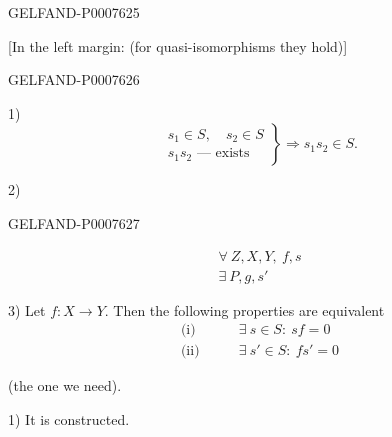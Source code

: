 \begin{GelfandAdjacentEvidence}{GELFAND-P000762}{5}


[In the left margin: (for quasi-isomorphisms they hold)]
\end{GelfandAdjacentEvidence}
\begin{GelfandAdjacentEvidence}{GELFAND-P000762}{6}


1)
\[
\left.
\begin{gathered}
s_1\in S,\quad s_2\in S\\
s_1s_2\text{ --- exists}
\end{gathered}
\right\}\Rightarrow s_1s_2\in S.
\]

2)
\end{GelfandAdjacentEvidence}
\begin{GelfandAdjacentEvidence}{GELFAND-P000762}{7}

\[
\begin{gathered}
\forall\ Z,X,Y,\ f,s\\
\exists\ P,g,s'
\end{gathered}
\]

3) Let \(f:X\longrightarrow Y\). Then the following properties are equivalent
\begin{align*}
\text{(i)}\qquad&\exists\ s\in S:\ sf=0\\
\text{(ii)}\qquad&\exists\ s'\in S:\ fs'=0
\end{align*}

\end{GelfandAdjacentEvidence}



(the one we need).

1) It is constructed.


